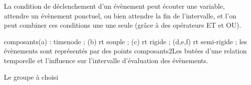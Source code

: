 \begin{apparte}
La condition de déclenchement d'un évènement peut écouter une variable, attendre un évènement ponctuel, ou bien attendre la fin de l'intervalle, et l'on peut combiner ces conditions une une seule (grâce à des opérateurs ET et OU).
\end{apparte}

%
{composants}{\textcolor{colorPri}{(a)} : \gls{timenode} ; %
                    \textcolor{colorPri}{(b)} \acrshort{rt} souple ; %
                    \textcolor{colorPri}{(c)} \acrshort{rt} rigide ; %
                    \textcolor{colorPri}{(d,e,f)} \acrshort{rt} semi-rigide ; %
                    les évènements sont représentés par des points%
                    }%
{composants2}{Les butées d'une relation temporelle et l'influence sur l'intervalle d'évaluation des évènements.}

Le groupe \ossia{} à choisi 